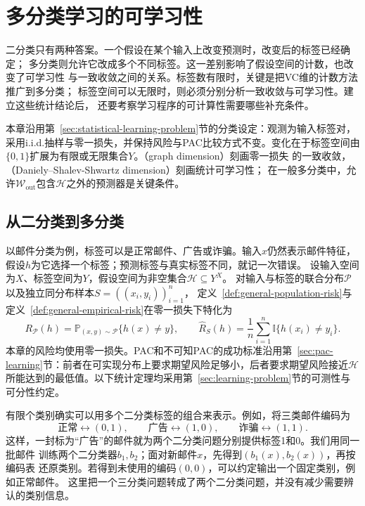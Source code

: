 \chapter{多分类学习的可学习性}
\label{chap:multiclass-learnability}

二分类只有两种答案。一个假设在某个输入上改变预测时，改变后的标签已经确定；
多分类则允许它改成多个不同标签。这一差别影响了假设空间的计数，也改变了可学习性
与一致收敛之间的关系。标签数有限时，关键是把VC维的计数方法推广到多分类；
标签空间可以无限时，则必须分别分析一致收敛与可学习性。建立这些统计结论后，
还要考察学习程序的可计算性需要哪些补充条件。

本章沿用第~\ref{sec:statistical-learning-problem}节的分类设定：观测为输入标签对，
采用i.i.d.抽样与零一损失，并保持风险与PAC比较方式不变。变化在于标签空间由
$\{0,1\}$扩展为有限或无限集合$Y$。（graph dimension）刻画零一损失
的一致收敛，（Daniely--Shalev-Shwartz dimension）刻画统计可学习性；
在一般多分类中，允许$\mathcal W_{\mathrm{out}}$包含$\mathcal H$之外的预测器是关键条件。

\section{从二分类到多分类}
\label{sec:multiclass-setting}

以邮件分类为例，标签可以是正常邮件、广告或诈骗。输入$x$仍然表示邮件特征，
假设$h$为它选择一个标签；预测标签与真实标签不同，就记一次错误。
设输入空间为$X$、标签空间为$Y$，假设空间为非空集合$\mathcal H\subseteq Y^X$。
对输入与标签的联合分布$\mathcal P$以及独立同分布样本$S=((x_i,y_i))_{i=1}^n$，
定义~\ref{def:general-population-risk}与定义~\ref{def:general-empirical-risk}在零一损失下特化为
\begin{equation}
 R_{\mathcal P}(h)=\mathbb P_{(x,y)\sim\mathcal P}\{h(x)\neq y\},\qquad
 \hat R_S(h)=\frac1n\sum_{i=1}^n\mathbb I\{h(x_i)\neq y_i\}.
 \label{eq:multiclass-risk}
\end{equation}
本章的风险均使用零一损失。PAC和不可知PAC的成功标准沿用第~\ref{sec:pac-learning}节：前者在可实现分布上要求期望风险足够小，后者要求期望风险接近$\mathcal H$所能达到的最低值。以下统计定理均采用第~\ref{sec:learning-problem}节的可测性与可分性约定。

有限个类别确实可以用多个二分类标签的组合来表示。例如，将三类邮件编码为
\[
 \text{正常}\longleftrightarrow(0,1),\qquad
 \text{广告}\longleftrightarrow(1,0),\qquad
 \text{诈骗}\longleftrightarrow(1,1).
\]
这样，一封标为“广告”的邮件就为两个二分类问题分别提供标签1和0。我们用同一批邮件
训练两个二分类器$b_1,b_2$；面对新邮件$x$，先得到$(b_1(x),b_2(x))$，再按编码表
还原类别。若得到未使用的编码$(0,0)$，可以约定输出一个固定类别，例如正常邮件。
这里把一个三分类问题转成了两个二分类问题，并没有减少需要辨认的类别信息。

